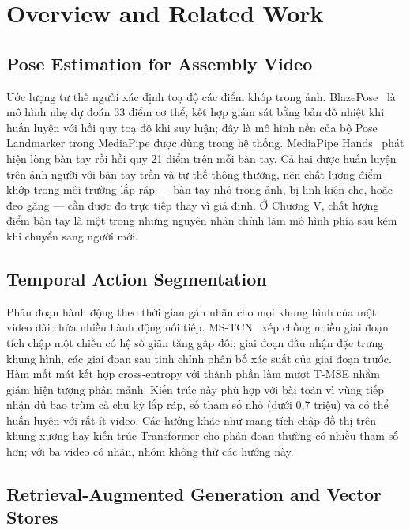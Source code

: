 \section{Overview and Related Work}

\subsection{Pose Estimation for Assembly Video}

Ước lượng tư thế người xác định toạ độ các điểm khớp trong ảnh. BlazePose~\citep{blazepose} là mô hình nhẹ dự đoán 33 điểm cơ thể, kết hợp giám sát bằng bản đồ nhiệt khi huấn luyện với hồi quy toạ độ khi suy luận; đây là mô hình nền của bộ Pose Landmarker trong MediaPipe được dùng trong hệ thống. MediaPipe Hands~\citep{mphands} phát hiện lòng bàn tay rồi hồi quy 21 điểm trên mỗi bàn tay. Cả hai được huấn luyện trên ảnh người với bàn tay trần và tư thế thông thường, nên chất lượng điểm khớp trong môi trường lắp ráp — bàn tay nhỏ trong ảnh, bị linh kiện che, hoặc đeo găng — cần được đo trực tiếp thay vì giả định. Ở Chương V, chất lượng điểm bàn tay là một trong những nguyên nhân chính làm mô hình phía sau kém khi chuyển sang người mới.

\subsection{Temporal Action Segmentation}

Phân đoạn hành động theo thời gian gán nhãn cho mọi khung hình của một video dài chứa nhiều hành động nối tiếp. MS-TCN~\citep{farha2019mstcn} xếp chồng nhiều giai đoạn tích chập một chiều có hệ số giãn tăng gấp đôi; giai đoạn đầu nhận đặc trưng khung hình, các giai đoạn sau tinh chỉnh phân bố xác suất của giai đoạn trước. Hàm mất mát kết hợp cross-entropy với thành phần làm mượt T-MSE nhằm giảm hiện tượng phân mảnh. Kiến trúc này phù hợp với bài toán vì vùng tiếp nhận đủ bao trùm cả chu kỳ lắp ráp, số tham số nhỏ (dưới 0,7 triệu) và có thể huấn luyện với rất ít video. Các hướng khác như mạng tích chập đồ thị trên khung xương hay kiến trúc Transformer cho phân đoạn thường có nhiều tham số hơn; với ba video có nhãn, nhóm không thử các hướng này.

\subsection{Retrieval-Augmented Generation and Vector Stores}

